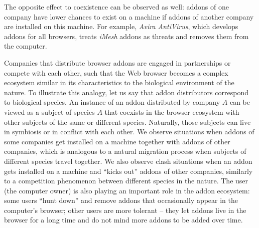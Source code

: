 \documentclass[11pt,oneside]{book}
\begin{document}
The opposite effect to coexistence can be observed as well: addons of one company have lower chances to exist on a machine if addons of another company are installed on this machine. For example, \emph{Avira AntiVirus}, which develops addons for all browsers, treats \emph{iMesh} addons as threats and removes them from the computer.

Companies that distribute browser addons are engaged in partnerships or compete with each other, such that the Web browser becomes a complex ecosystem similar in its characteristics to the biological environment of the nature. To illustrate this analogy, let us say that addon distributors correspond to biological species. An instance of an addon distributed by company $A$ can be viewed as a subject of species $A$ that coexists in the browser ecosystem with other subjects of the same or different species. Naturally, those subjects can live in symbiosis or in conflict with each other. We observe situations when addons of some companies get installed on a machine together with addons of other companies, which is analogous to a natural migration process when subjects of different species travel together. We also observe clash situations when an addon gets installed on a machine and ``kicks out'' addons of other companies, similarly to a competition phenomenon between different species in the nature. The user (the computer owner) is also playing an important role in the addon ecosystem: some users ``hunt down'' and remove addons that occasionally appear in the computer's browser; other users are more tolerant -- they let addons live in the browser for a long time and do not mind more addons to be added over time.
\end{document}
